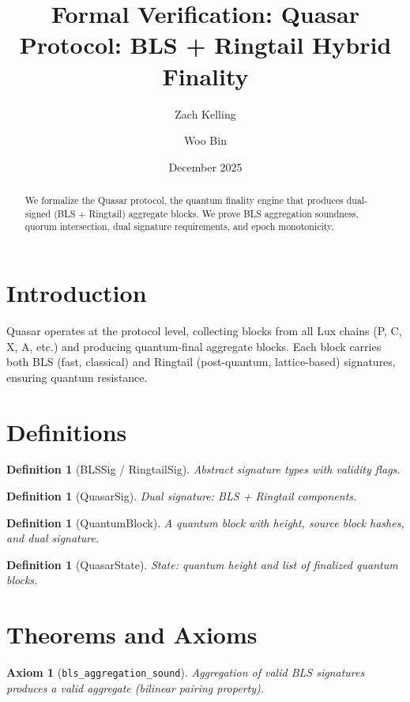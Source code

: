 \documentclass[11pt]{article}
\title{Formal Verification: Quasar Protocol: BLS + Ringtail Hybrid Finality}
\author{Zach Kelling \and Woo Bin}
\date{December 2025}
\newtheorem{definition}[theorem]{Definition}
\newtheorem{axiom_stmt}[theorem]{Axiom}
\begin{document}
\maketitle

\begin{abstract}
We formalize the Quasar protocol, the quantum finality engine that produces dual-signed (BLS + Ringtail) aggregate blocks. We prove BLS aggregation soundness, quorum intersection, dual signature requirements, and epoch monotonicity.
\end{abstract}

\section{Introduction}
Quasar operates at the protocol level, collecting blocks from all Lux chains (P, C, X, A, etc.) and producing quantum-final aggregate blocks. Each block carries both BLS (fast, classical) and Ringtail (post-quantum, lattice-based) signatures, ensuring quantum resistance.

\section{Definitions}
\begin{definition}[BLSSig / RingtailSig]
Abstract signature types with validity flags.
\end{definition}

\begin{definition}[QuasarSig]
Dual signature: BLS + Ringtail components.
\end{definition}

\begin{definition}[QuantumBlock]
A quantum block with height, source block hashes, and dual signature.
\end{definition}

\begin{definition}[QuasarState]
State: quantum height and list of finalized quantum blocks.
\end{definition}


\section{Theorems and Axioms}
\begin{axiom_stmt}[\texttt{bls\_aggregation\_sound}]
Aggregation of valid BLS signatures produces a valid aggregate (bilinear pairing property).
\end{axiom_stmt}
\end{document}
